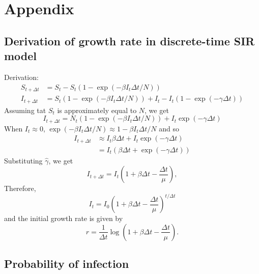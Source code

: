 \documentclass{article}
\begin{document}


\pagebreak

\section{Appendix}

\subsection{Derivation of growth rate in discrete-time SIR model}


Derivation:
\begin{equation}
\begin{aligned}
S_{t+\Delta t} &= S_t - S_t (1- \exp(-\beta I_t \Delta t/N))\\
I_{t+\Delta t} &= S_t (1- \exp(-\beta I_t \Delta t/N)) + I_t - I_t (1- \exp(-\gamma \Delta t))
\end{aligned}
\end{equation}
Assuming tat $S_t$ is approximately equal to $N$, we get
\begin{equation}
I_{t+\Delta t} = N_t (1- \exp(-\beta I_t \Delta t/N)) + I_t \exp(-\gamma \Delta t)
\end{equation}
When $I_t \approx 0$, $\exp(-\beta I_t \Delta t/N) \approx 1 - \beta I_t \Delta t/N$ and so
\begin{equation}
\begin{aligned}
I_{t+\Delta t} &\approx  I_t \beta \Delta t + I_t \exp(-\gamma \Delta t)\\
&= I_t (\beta \Delta t + \exp(-\gamma \Delta t))
\end{aligned}
\end{equation}
Substituting $\hat{\gamma}$, we get
\begin{equation}
I_{t+\Delta t} = I_t \left(1 + \beta \Delta t - \frac{\Delta t}{\mu}\right),
\end{equation}
Therefore,
\begin{equation}
I_{t} = I_0 \left(1 + \beta\Delta t - \frac{\Delta t}{\mu}\right)^{t/\Delta t}
\end{equation}
and the initial growth rate is given by
\begin{equation}
r = \frac{1}{\Delta t} \log \left(1 + \beta \Delta t - \frac{\Delta t}{\mu}\right).
\end{equation}




\subsection{Probability of infection}
\end{document}
